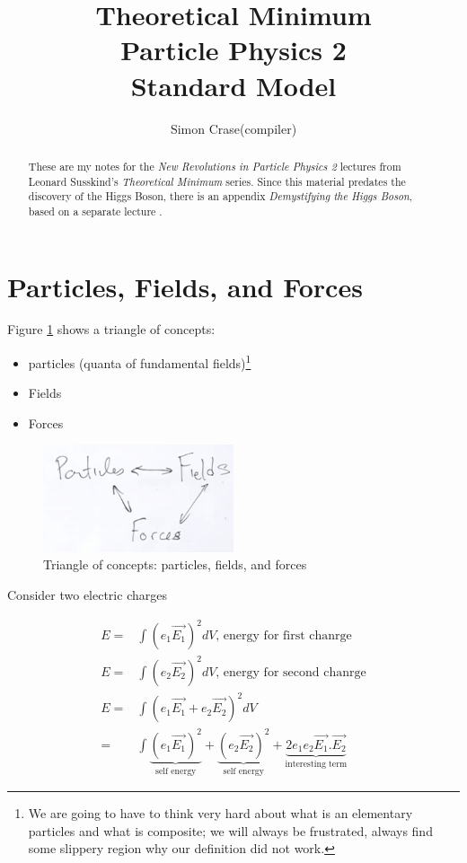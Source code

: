 \documentclass[]{article}
\title{Theoretical Minimum\\Particle Physics 2\\Standard Model}
\author{Simon Crase(compiler)}
\begin{document}
\maketitle

\begin{abstract}
These are my notes for the \emph{New Revolutions in Particle Physics 2} lectures from Leonard Susskind's \emph{Theoretical Minimum} series\cite{susskind2009standard}. Since this material predates the discovery of the Higgs Boson, there is an appendix \emph{Demystifying the Higgs Boson}, based on a separate lecture \cite{susskind2010demystifing}.
\end{abstract}

\tableofcontents
\listoffigures
\listoftables
\listoftheorems

\section{Particles, Fields, and Forces}

Figure \ref{fig:particles:fields:forces} shows a triangle of concepts:
\begin{itemize}
	\item particles (quanta of fundamental fields)\footnote{We are going to have to think very hard about what is an elementary particles and what is composite; we will always be frustrated, always find some slippery region why our definition did not work.}
	\item Fields
	\item Forces
\end{itemize}

\begin{figure}[H]
	\begin{center}
		\caption{Triangle of concepts: particles, fields, and forces}\label{fig:particles:fields:forces}
		\includegraphics[width=0.5\textwidth]{ParticlesFieldsForces}
	\end{center}
\end{figure}

Consider two electric charges

\begin{align*}
E=&\int (e_1 \vec{E_1})^2 dV \text{, energy for first chanrge}\\
E=&\int (e_2 \vec{E_2})^2 dV \text{, energy for second chanrge}\\
E=&\int (e_1\vec{E_1}+e_2 \vec{E_2})^2 dV\\
=&\int \underbrace{(e_1\vec{E_1})^2}_\text{self energy}+ \underbrace{(e_2\vec{E_2})^2}_\text{self energy} + \underbrace{2e_1e_2\vec{E_1}.\vec{E_2}}_\text{interesting term}
\end{align*}
\end{document}
